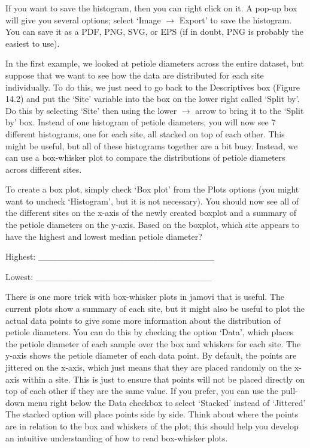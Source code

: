 \documentclass[
  openany]{scrbook}
\begin{document}
\begin{verbatim}






\end{verbatim}

If you want to save the histogram, then you can right click on it.
A pop-up box will give you several options; select `Image \(\to\) Export' to save the histogram.
You can save it as a PDF, PNG, SVG, or EPS (if in doubt, PNG is probably the easiest to use).

In the first example, we looked at petiole diameters across the entire dataset, but suppose that we want to see how the data are distributed for each site individually.
To do this, we just need to go back to the Descriptives box (Figure 14.2) and put the `Site' variable into the box on the lower right called `Split by'.
Do this by selecting `Site' then using the lower \(\to\) arrow to bring it to the `Split by' box.
Instead of one histogram of petiole diameters, you will now see 7 different histograms, one for each site, all stacked on top of each other.
This might be useful, but all of these histograms together are a bit busy.
Instead, we can use a box-whisker plot to compare the distributions of petiole diameters across different sites.

To create a box plot, simply check `Box plot' from the Plots options (you might want to uncheck `Histogram', but it is not necessary).
You should now see all of the different sites on the x-axis of the newly created boxplot and a summary of the petiole diameters on the y-axis.
Based on the boxplot, which site appears to have the highest and lowest median petiole diameter?

Highest: \_\_\_\_\_\_\_\_\_\_\_\_\_\_\_\_\_\_\_\_\_\_\_\_\_\_\_\_

Lowest: \_\_\_\_\_\_\_\_\_\_\_\_\_\_\_\_\_\_\_\_\_\_\_\_\_\_\_\_

There is one more trick with box-whisker plots in jamovi that is useful.
The current plots show a summary of each site, but it might also be useful to plot the actual data points to give some more information about the distribution of petiole diameters.
You can do this by checking the option `Data', which places the petiole diameter of each sample over the box and whiskers for each site.
The y-axis shows the petiole diameter of each data point.
By default, the points are jittered on the x-axis, which just means that they are placed randomly on the x-axis within a site.
This is just to ensure that points will not be placed directly on top of each other if they are the same value.
If you prefer, you can use the pull-down menu right below the Data checkbox to select `Stacked' instead of `Jittered'
The stacked option will place points side by side.
Think about where the points are in relation to the box and whiskers of the plot; this should help you develop an intuitive understanding of how to read box-whisker plots.
\end{document}
